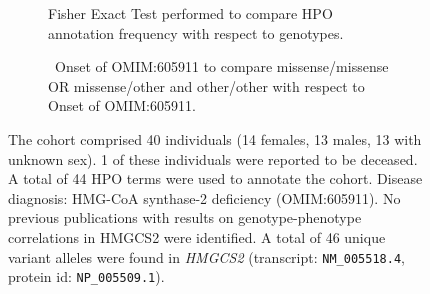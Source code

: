 \begin{figure}[htbp]
\begin{subfigure}[b]{0.95\textwidth}
\centering
{}
\captionsetup{justification=raggedright,singlelinecheck=false}
\caption{Fisher Exact Test performed to compare HPO annotation frequency with respect to genotypes. }
\end{subfigure}

\vspace{2em}

\begin{subfigure}[b]{0.95\textwidth}
\captionsetup{justification=raggedright,singlelinecheck=false}
\caption{ Onset of OMIM:605911 to compare missense/missense OR missense/other and other/other with respect to Onset of OMIM:605911. }
\end{subfigure}

\vspace{2em}

\caption{The cohort comprised 40 individuals (14 females, 13 males, 13 with unknown sex). 1 of these individuals were reported to be deceased. A total of 44 HPO terms were used to annotate the cohort. Disease diagnosis: HMG-CoA synthase-2 deficiency (OMIM:605911). No previous publications with results on genotype-phenotype correlations in HMGCS2 were identified. A total of 46 unique variant alleles were found in \textit{HMGCS2} (transcript: \texttt{NM\_005518.4}, protein id: \texttt{NP\_005509.1}).}
\end{figure}
